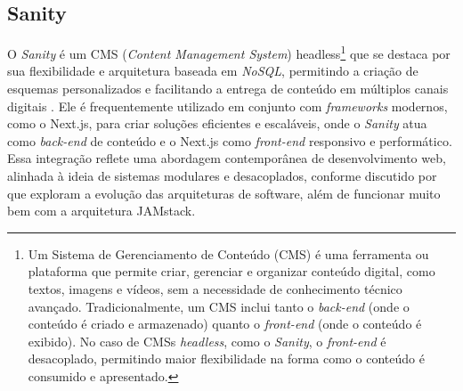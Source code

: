 {    %
    
    
    
    \subsection{Sanity}
    O \textit{Sanity} é um CMS (\textit{Content Management System}) headless\footnote{ Um Sistema de Gerenciamento de Conteúdo (CMS) é uma ferramenta ou plataforma que permite criar, gerenciar e organizar conteúdo digital, como textos, imagens e vídeos, sem a necessidade de conhecimento técnico avançado. Tradicionalmente, um CMS inclui tanto o \textit{back-end} (onde o conteúdo é criado e armazenado) quanto o \textit{front-end} (onde o conteúdo é exibido). No caso de CMSs \textit{headless}, como o \textit{Sanity}, o \textit{front-end} é desacoplado, permitindo maior flexibilidade na forma como o conteúdo é consumido e apresentado.} que se destaca por sua flexibilidade e arquitetura baseada em \textit{NoSQL}, permitindo a criação de esquemas personalizados e facilitando a entrega de conteúdo em múltiplos canais digitais \citep{sanity_official}. Ele é frequentemente utilizado em conjunto com \textit{frameworks} modernos, como o Next.js, para criar soluções eficientes e escaláveis, onde o \textit{Sanity} atua como \textit{back-end} de conteúdo e o Next.js como \textit{front-end} responsivo e performático. Essa integração reflete uma abordagem contemporânea de desenvolvimento web, alinhada à ideia de sistemas modulares e desacoplados, conforme discutido por \cite{gamma2000padrões} que exploram a evolução das arquiteturas de software, além de funcionar muito bem com a arquitetura JAMstack. 
    
}
